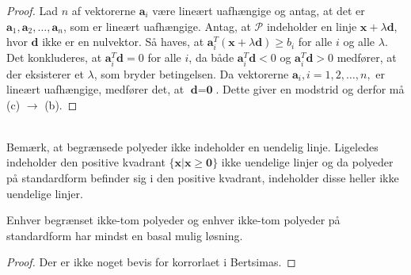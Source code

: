 \begin{proof}
%
Lad $n$ af vektorerne $\textbf{a}_i$ være lineært uafhængige og antag, at det er $\textbf{a}_1, \textbf{a}_2, \ldots , \textbf{a}_n$, som er lineært uafhængige.
Antag, at $\mathcal{P}$ indeholder en linje $\textbf{x} + \lambda \textbf{d}$, hvor $\textbf{d}$ ikke er en nulvektor.
Så haves, at $\textbf{a}_i^T (\textbf{x} + \lambda \textbf{d}) \geq b_i$ for alle $i$ og alle $\lambda$.
Det konkluderes, at $\textbf{a}_i^T \textbf{d} = 0$ for alle $i$, da både  $\textbf{a}_i^T \textbf{d} < 0$ og  $\textbf{a}_i^T \textbf{d} > 0$ medfører, at der eksisterer et $\lambda$, som bryder betingelsen.
Da vektorerne $\textbf{a}_i, i = 1, 2, \ldots, n,$ er lineært uafhængige, medfører det, at $\textbf{d}=\textbf{0}$.
Dette giver en modstrid og derfor må (c) $\rightarrow$ (b).
\end{proof}\\
%
Bemærk, at begrænsede polyeder ikke indeholder en uendelig linje.
Ligeledes indeholder den positive kvadrant $\{ \textbf{x}|\textbf{x} \geq \textbf{0}\}$ ikke uendelige linjer og da polyeder på standardform befinder sig i den positive kvadrant, indeholder disse heller ikke uendelige linjer.
%
\begin{kor}{}{}
Enhver begrænset ikke-tom polyeder og enhver ikke-tom polyeder på standardform har mindst en basal mulig løsning.
\end{kor}
%
\begin{proof}
Der er ikke noget bevis for korrorlaet i Bertsimas.
\end{proof}